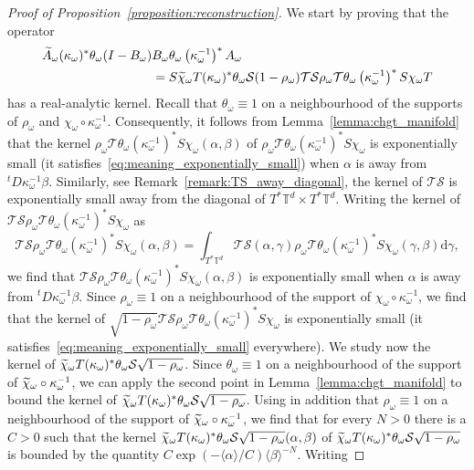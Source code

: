 \documentclass[10pt]{amsart}
\theoremstyle{definition}\newtheorem{defi}[theo]{Definition}\newtheorem{rema}[theo]{Remark}\newtheorem{exam}[theo]{Example}\newtheorem{exem}[theo]{Example}\newtheorem{nota}[theo]{Notation}
\newcommand{\brac}[1]{\langle #1 \rangle}
\newcommand{\clT}{\mathcal{T}}
\newcommand{\clS}{\mathcal{S}}
\newcommand{\bbT}{\mathbb{T}}
\newcommand{\rmd}{\mathrm{d}}
\let\oldtilde\tilde
\renewcommand*{\tilde}[1]{\mathchoice{\widetilde{#1}}{\widetilde{#1}}{\oldtilde{#1}}{\oldtilde{#1}}}
\begin{document}
\begin{proof}[Proof of Proposition~\ref{proposition:reconstruction}]
We start by proving that the operator
\begin{equation}\label{eq:analytic_1}
\begin{split}
\widetilde{A}_\omega (\kappa_\omega)^* \theta_\omega (I - B_\omega) & B_\omega \theta_\omega \left(\kappa_\omega^{-1}\right)^* A_\omega \\
& = S \tilde{\chi}_\omega T (\kappa_\omega)^*\theta_\omega \clS (1 - \rho_\omega) \clT \clS \rho_\omega \clT \theta_\omega \left(\kappa_\omega^{-1}\right)^* S \chi_\omega T
\end{split}
\end{equation}
has a real-analytic kernel. Recall that $\theta_\omega \equiv 1$ on a neighbourhood of the supports of $\rho_\omega$ and $\chi_\omega \circ \kappa_\omega^{-1}$. Consequently, it follows from Lemma~\ref{lemma:chgt_manifold} that the kernel $\rho_\omega \clT \theta_\omega (\kappa_\omega^{-1})^* S \chi_\omega(\alpha,\beta)$ of $\rho_\omega \clT \theta_\omega (\kappa_\omega^{-1})^* S \chi_\omega$ is exponentially small (it satisfies~\eqref{eq:meaning_exponentially_small}) when $\alpha$ is away from ${}^t D \kappa_\omega^{-1} \beta$. Similarly, see Remark~\ref{remark:TS_away_diagonal}, the kernel of $\clT\clS$ is exponentially small away from the diagonal of $T^* \bbT^d \times T^* \bbT^d$. Writing the kernel of $\clT \clS \rho_\omega \clT \theta_\omega (\kappa_\omega^{-1})^* S \chi_\omega$ as
\begin{equation*}
\clT \clS \rho_\omega \clT \theta_\omega \left(\kappa_\omega^{-1}\right)^* S \chi_\omega(\alpha,\beta) = \int_{T^* \bbT^d} \clT\clS(\alpha,\gamma) \rho_\omega \clT \theta_\omega \left(\kappa_\omega^{-1}\right)^* S \chi_\omega(\gamma,\beta) \rmd \gamma,
\end{equation*}
we find that $\clT \clS \rho_\omega \clT \theta_\omega (\kappa_\omega^{-1})^* S \chi_\omega(\alpha,\beta)$ is exponentially small when $\alpha$ is away from ${}^t D \kappa_\omega^{-1} \beta$. Since $\rho_\omega \equiv 1$ on a neighbourhood of the support of $\chi_\omega \circ \kappa_\omega^{-1}$, we find that the kernel of $\sqrt{1 - \rho_\omega}\clT \clS \rho_\omega \clT \theta_\omega (\kappa_\omega^{-1})^* S \chi_\omega$ is exponentially small (it satisfies~\eqref{eq:meaning_exponentially_small} everywhere). We study now the kernel of $\tilde{\chi}_\omega T (\kappa_\omega)^*\theta_\omega \clS \sqrt{1 - \rho_\omega}$. Since $\theta_\omega \equiv 1$ on a neighbourhood of the support of $\tilde{\chi}_\omega \circ \kappa_\omega^{-1}$, we can apply the second point in Lemma~\ref{lemma:chgt_manifold} to bound the kernel of $\tilde{\chi}_\omega T (\kappa_\omega)^*\theta_\omega \clS \sqrt{1 - \rho_\omega}$. Using in addition that $\rho_\omega \equiv 1$ on a neighbourhood of the support of $\tilde{\chi}_\omega \circ \kappa_\omega^{-1}$, we find that for every $N > 0$ there is a $C > 0 $ such that the kernel $\tilde{\chi}_\omega T (\kappa_\omega)^*\theta_\omega \clS \sqrt{1 - \rho_\omega}(\alpha,\beta)$ of $\tilde{\chi}_\omega T (\kappa_\omega)^*\theta_\omega \clS \sqrt{1 - \rho_\omega}$ is bounded by the quantity $C\exp(- \brac{\alpha}/C) \brac{\beta}^{-N}$. Writing

\end{proof}
\end{document}
